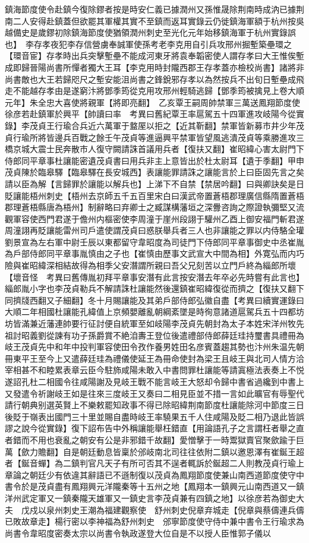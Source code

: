 鎮海節度使令赴鎮今復除鏐者按是時安仁義已據潤州又孫惟晟除荆南時成汭已據荆南二人安得赴鎮蓋但欲罷其軍權其實不至鎮而返耳實錄云仍徙鎮海軍額于杭州按吳越備史是歲鏐初除鎮海節度使猶領潤州刺史至光化元年始移鎮海軍于杭州實錄誤也】　李存孝夜犯李存信營虜奉誠軍使孫考老李克用自引兵攻邢州掘塹築壘環之【環音宦】存孝時出兵突擊塹壘不能成河東牙將袁奉韜密使人謂存孝曰大王惟俟塹成即歸晉陽尚書所憚者獨大王耳【李克用時封隴西郡王存孝蓋亦檢校尚書】諸將非尚書敵也大王若歸咫尺之塹安能沮尚書之鋒銳邪存孝以為然按兵不出旬日塹壘成飛走不能越存孝由是遂窮汴將鄧季筠從克用攻邢州輕騎逃歸【鄧季筠被擒見上卷大順元年】朱全忠大喜使將親軍【將即亮翻】　乙亥覃王嗣周帥禁軍三萬送鳳翔節度使徐彦若赴鎮軍於興平【帥讀曰率　考異曰舊紀覃王率扈駕五十四軍進攻岐陽今從實錄】李茂貞王行瑜合兵近六萬軍于盩厔以拒之【近其靳翻】禁軍皆新募市井少年茂貞行瑜所將皆邊兵百戰之餘壬午茂貞等進逼興平禁軍皆望風逃潰茂貞等乘勝進攻三橋京城大震士民奔散市人復守闕請誅首議用兵者【復扶又翻】崔昭緯心害太尉門下侍郎同平章事杜讓能密遺茂貞書曰用兵非主上意皆出於杜太尉耳【遺于季翻】甲申茂貞陳於臨皋驛【臨皋驛在長安城西】表讓能罪請誅之讓能言於上曰臣固先言之矣請以臣為解【言歸罪於讓能以解兵也】上涕下不自禁【禁居吟翻】曰與卿訣矣是日貶讓能梧州刺史【梧州去京師五千五百里宋白曰漢武帝置蒼梧郡理廣信縣隋置蒼梧郡理蒼梧縣唐為梧州】制辭略曰弃卿士之臧謀構藩垣之深釁咨詢之際證執彌堅又流觀軍容使西門君遂于儋州内樞密使李周潼于崖州段詡于驩州乙酉上御安福門斬君遂周潼詡再貶讓能雷州司戶遣使謂茂貞曰惑朕舉兵者三人也非讓能之罪以内侍駱全瓘劉景宣為左右軍中尉壬辰以東都留守韋昭度為司徒門下侍郎同平章事御史中丞崔胤為戶部侍郎同平章事胤慎由之子也【崔慎由歷事文武宣大中間為相】外寛弘而内巧險與崔昭緯深相結故得為相季父安潛謂所親曰吾父兄刻苦以立門戶終為緇郎所壞【壞音怪　考異曰舊傳胤初拜平章事安潛有此言按安潛去年卒必先時嘗有此言也】緇郎胤小字也李茂貞勒兵不解請誅杜讓能然後還鎮崔昭緯復從而擠之【復扶又翻下同擠牋西翻又子細翻】冬十月賜讓能及其弟戶部侍郎弘徽自盡【考異曰續實運錄曰大順二年相國杜讓能孔緯值上京頻嬰離亂朝綱紊墜是時徇意諸道扈駕兵五十四都坊坊皆滿兼近藩連帥要行征討便自統軍至如岐陽李茂貞先朝封為太子本姓宋洋州牧先祖討昭義劉從諫有功子孫爵賞不絶洎夀王登位後遣禮部侍郎薛廷珪持璽書具禮冊為岐王茂貞先中和年中投判軍容使田令孜作養男姓田名彦賓蓋趨其勢也汴州朱温先朝冊東平王至今上又遣薛廷珪為禮儀使延王為冊命使封為梁王且岐王與北司人情方洽宰相甚不和睦累表章云臣今駐斾咸陽未敢入中書問罪杜讓能等請寘極法表奏上不悦遂詔孔杜二相國令往咸陽謝及見岐王戰不能言岐王大怒却令歸中書省過纔到中書上又發遣令祈謝岐王如是往來三度岐王又奏曰二相見臣並不措一言如此曠官有辱聖代請行朝典别選英賢上不樂敕罷知政事不得已除昭緯荆南節度杜讓能除河中節度三日後貶于嶺表出國門三十里並賜自盡時岐王率驍果五千人住咸陽及貶二相乃退此皆誤謬之說今從實錄】復下詔布告中外稱讓能舉枉錯直【用論語孔子之言謂枉者舉之直者錯而不用也衰亂之朝安有公是非邪錯千故翻】愛憎擊于一時鬻獄賣官聚歛踰于巨萬【歛力贍翻】自是朝廷動息皆稟於邠岐南北司往往依附二鎮以邀恩澤有崔鋋王超者【鋋音蟬】為二鎮判官凡天子有所可否其不逞者輒訴於鋋超二人則教茂貞行瑜上章論之朝廷少有依違其辭語已不遜制復以茂貞為鳳翔節度使兼山南西道節度使守中書令於是茂貞盡有鳳翔興元洋隴秦等十五州之地【鳳翔本一鎮興元山南西道又一鎮洋州武定軍又一鎮秦隴天雄軍又一鎮史言李茂貞兼有四鎮之地】以徐彦若為御史大夫　戊戍以泉州刺史王潮為福建觀察使　舒州刺史倪章弃城走【倪章與蔡儔連兵儔已敗故章走】楊行密以李神福為舒州刺史　邠寧節度使守侍中兼中書令王行瑜求為尚書令韋昭度密奏太宗以尚書令執政遂登大位自是不以授人臣惟郭子儀以